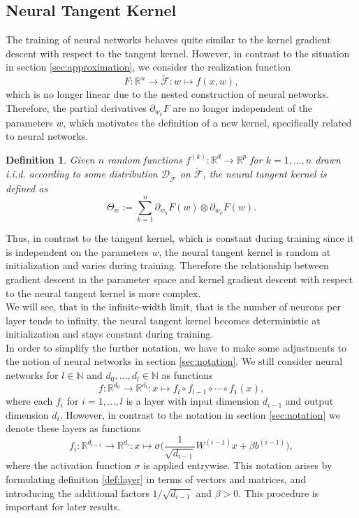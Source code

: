 \documentclass[11pt, a4paper]{article}
\newtheorem{definition}[theorem]{Definition}
\newcommand{\N}{\mathds{N}}
\newcommand{\R}{\mathds{R}}
\newcommand{\D}{\mathcal{D}}
\newcommand{\F}{\mathcal{F}}
\begin{document}
\subsection{Neural Tangent Kernel}

The training of neural networks behaves quite similar to the kernel gradient descent with respect to the tangent kernel. However, in contrast to the situation in section \ref{sec:approximation}, we consider the realization function
\[ F: \R^n \to \tilde{\F} : w \mapsto f(x,w), \]
 which is no longer linear due to the nested construction of neural networks. Therefore, the partial derivatives $\partial_{w_k}F$ are no longer independent of the parameters $w$, which motivates the definition of a new kernel, specifically related to neural networks.

\begin{definition}
Given $n$ random functions $f^{(k)} : \R^d \to \R^p$ for $k=1,\dots,n$ drawn i.i.d. according to some distribution $\D_{\tilde{\F}}$ on $\tilde{\F}$, the neural tangent kernel is defined as
\[ \Theta_w := \sum_{k=1}^{n} \partial_{w_k} F(w) \otimes \partial_{w_k} F(w). \]
\end{definition}

Thus, in contrast to the tangent kernel, which is constant during training since it is independent on the parameters $w$, the neural tangent kernel is random at initialization and varies during training. Therefore the relationship between gradient descent in the parameter space and kernel gradient descent with respect to the neural tangent kernel is more complex. \\

We will see, that in the infinite-width limit, that is the number of neurons per layer tends to infinity, the neural tangent kernel becomes deterministic at initialization and stays constant during training. \\

In order to simplify the further notation, we have to make some adjustments to the notion of neural networks in section \ref{sec:notation}. We still consider neural networks for $l \in \N$ and $d_0, \dots, d_l \in \N$ as functions
\[ f: \R^{d_0} \to \R^{d_l} : x \mapsto f_l \circ f_{l-1} \circ \cdots \circ f_1(x), \]
where each $f_i$ for $i=1, \dots, l$ is a layer with input dimension $d_{i-1}$ and output dimension $d_i$. However, in contrast to the notation in section \ref{sec:notation} we denote these layers as functions 
\[ f_{i} : \R^{d_{i-1}} \to \R^{d_i} : x \mapsto \sigma \Big ( \frac{1}{\sqrt{d_{i-1}}} W^{(i-1)}x + \beta b^{(i-1)} \Big ), \]
where the activation function $\sigma$ is applied entrywise. This notation arises by formulating definition \ref{def:layer} in terms of vectors and matrices, and introducing the additional factors $1/\sqrt{d_{i-1}}$ and $\beta > 0$. This procedure is important for later results.
\end{document}
